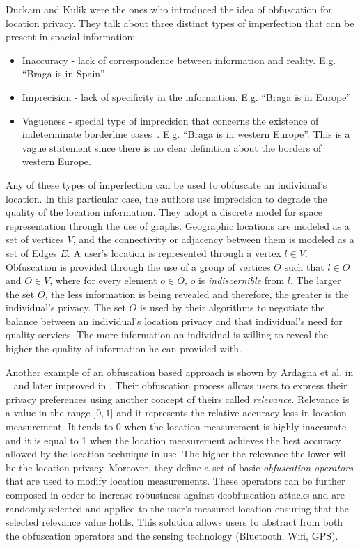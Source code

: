 Duckam and Kulik
\cite{duckham2005formal} were the ones who introduced the idea of
obfuscation for location privacy. They talk about three distinct types of
imperfection that can be present in spacial information:
\begin{itemize}
\item Inaccuracy - lack of correspondence between information and
  reality. E.g. ``Braga is in Spain''
\item Imprecision - lack of specificity in the information. E.g.
  ``Braga is in Europe''
\item Vagueness - special type of imprecision that concerns the
  existence of indeterminate borderline
  cases~\cite{duckham2001formal}. E.g. ``Braga is in western Europe''.
  This is a vague statement since there is no clear definition about
  the borders of western Europe.
\end{itemize}

Any of these types of imperfection can be used to obfuscate an
individual's location. In this particular case, the authors use
imprecision to degrade the quality of the location information.
They adopt a discrete model for space representation through the use of
graphs. Geographic locations are modeled as a set of vertices $V$, and
the connectivity or adjacency between them is modeled as a set of
Edges $E$. A user's location is represented through a
vertex $l \in V$. Obfuscation is provided through the use of a group
of vertices $O$ such that $l \in O$ and $O \in V$, where for every
element $o \in O$, $o$ is \emph{indiscernible} from $l$. The larger
the set $O$, the less information is being revealed and therefore, the
greater is the individual's privacy. The set $O$ is used by their
algorithms to negotiate the balance between an individual's location
privacy and that individual's need for quality services. The more
information an individual is willing to reveal the higher the quality
of information he can provided with.

Another example of an obfuscation based approach is shown by
Ardagna et al. in ~\cite{ardagna2007middleware} and later improved in
\cite{ardagna2007location, ardagna2011obfuscation}. Their obfuscation
process allows users to express their privacy preferences using
another concept of theirs called \emph{relevance}. Relevance is a
value in the range $]0,1]$ and it represents the relative accuracy
loss in location measurement. It tends to 0 when the location
measurement is highly inaccurate and it is equal to 1 when the
location measurement achieves the best accuracy allowed by the
location technique in use. The higher the relevance the lower will be the
location privacy. Moreover, they define a set of basic
\emph{obfuscation operators} that are used to modify location
measurements. These operators can be further composed in order to
increase robustness against deobfuscation attacks and are
randomly selected and applied to the user's measured location ensuring
that the selected relevance value holds. This solution allows users to
abstract from both the obfuscation operators and the sensing
technology (Bluetooth, Wifi, GPS).

